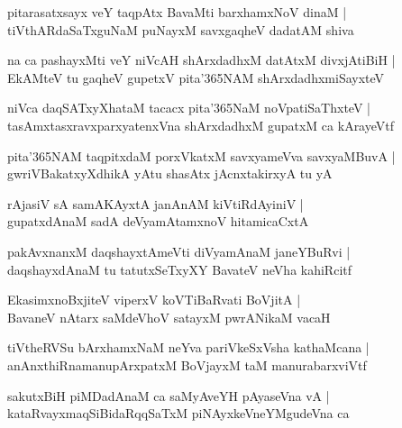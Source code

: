 \begin{shloka}
pitarasatxsayx veY taqpAtx BavaMti barxhamxNoV dinaM |\\
tiVthARdaSaTxguNaM puNayxM savxgaqheV dadatAM shiva
\end{shloka}

\begin{shloka}
na ca pashayxMti veY niVcAH shArxdadhxM datAtxM divxjAtiBiH |\\
EkAMteV tu gaqheV gupetxV pita\char'365NAM shArxdadhxmiSayxteV 
\end{shloka}

\begin{shloka}
niVca daqSATxyXhataM tacacx pita\char'365NaM noVpatiSaThxteV |\\
tasAmxtasxravxparxyatenxVna shArxdadhxM gupatxM ca kArayeVtf
\end{shloka}

\begin{shloka}
pita\char'365NAM taqpitxdaM porxVkatxM savxyameVva savxyaMBuvA |\\
gwriVBakatxyXdhikA yAtu shasAtx jAcnxtakirxyA tu yA 
\end{shloka}

\begin{shloka}
rAjasiV sA samAKAyxtA janAnAM kiVtiRdAyiniV |\\
gupatxdAnaM sadA deVyamAtamxnoV hitamicaCxtA 
\end{shloka}

\begin{shloka}
pakAvxnanxM daqshayxtAmeVti diVyamAnaM janeYBuRvi |\\
daqshayxdAnaM tu tatutxSeTxyXY BavateV neVha kahiRcitf
\end{shloka}

\begin{shloka}
EkasimxnoBxjiteV viperxV koVTiBaRvati BoVjitA |\\
BavaneV nAtarx saMdeVhoV satayxM pwrANikaM vacaH 
\end{shloka}

\begin{shloka}
tiVtheRVSu bArxhamxNaM neYva pariVkeSxVsha kathaMcana |\\
anAnxthiRnamanupArxpatxM BoVjayxM taM manurabarxviVtf
\end{shloka}

\begin{shloka}
sakutxBiH piMDadAnaM ca saMyAveYH pAyaseVna vA |\\
kataRvayxmaqSiBidaRqqSaTxM piNAyxkeVneYMgudeVna ca
\end{shloka}

